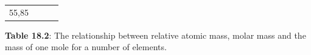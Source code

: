 {{\begin{center}
\begin{xtabular}[t]{|l|l|l|l|}
    
        55,85%
     \tabularnewline{}
    \end{xtabular}
      \end{center}
    \begin{center}{\small\bfseries Table 18.2}: The relationship between relative atomic mass, molar mass and the mass of one mole for a number of elements.\end{center}
    
    \addtocounter{footnote}{-0}
    
          } %
        }{%
        }
